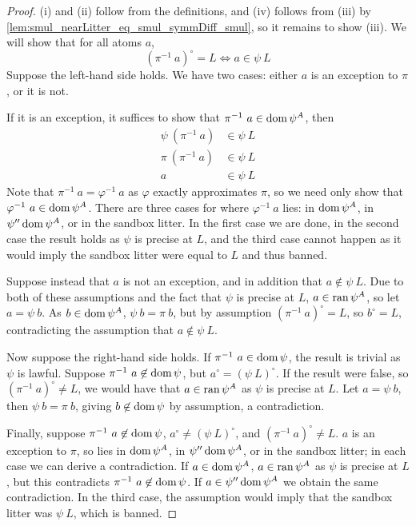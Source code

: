 \begin{proof}
    (i) and (ii) follow from the definitions, and (iv) follows from (iii) by \cref{lem:smul_nearLitter_eq_smul_symmDiff_smul}, so it remains to show (iii).
    We will show that for all atoms \( a \),
    \[ (\pi^{-1}\ a)^\circ = L \Leftrightarrow a \in \psi\ L \]
    Suppose the left-hand side holds.
    We have two cases: either \( a \) is an exception to \( \pi \), or it is not.

    If it is an exception, it suffices to show that \( \pi^{-1}\ a \in \operatorname{dom} \psi^A \), then
    \begin{align*}
        \psi\ (\pi^{-1}\ a) &\in \psi\ L \\
        \pi\ (\pi^{-1}\ a) &\in \psi\ L \\
        a &\in \psi\ L
    \end{align*}
    Note that \( \pi^{-1}\ a = \varphi^{-1}\ a \) as \( \varphi \) exactly approximates \( \pi \), so we need only show that \( \varphi^{-1}\ a \in \operatorname{dom} \psi^A \).
    There are three cases for where \( \varphi^{-1}\ a \) lies: in \( \operatorname{dom} \psi^A \), in \( \psi '' \operatorname{dom} \psi^A \), or in the sandbox litter.
    In the first case we are done, in the second case the result holds as \( \psi \) is precise at \( L \), and the third case cannot happen as it would imply the sandbox litter were equal to \( L \) and thus banned.

    Suppose instead that \( a \) is not an exception, and in addition that \( a \not\in \psi\ L \).
    Due to both of these assumptions and the fact that \( \psi \) is precise at \( L \), \( a \in \operatorname{ran} \psi^A \), so let \( a = \psi\ b \).
    As \( b \in \operatorname{dom} \psi^A \), \( \psi\ b = \pi\ b \), but by assumption \( (\pi^{-1}\ a)^\circ = L \), so \( b^\circ = L \), contradicting the assumption that \( a \not\in \psi\ L \).

    Now suppose the right-hand side holds.
    If \( \pi^{-1}\ a \in \operatorname{dom} \psi \), the result is trivial as \( \psi \) is lawful.
    Suppose \( \pi^{-1}\ a \not\in \operatorname{dom} \psi \), but \( a^\circ = (\psi\ L)^\circ \).
    If the result were false, so \( (\pi^{-1}\ a)^\circ \neq L \), we would have that \( a \in \operatorname{ran} \psi^A \) as \( \psi \) is precise at \( L \).
    Let \( a = \psi\ b \), then \( \psi\ b = \pi\ b \), giving \( b \not\in \operatorname{dom} \psi \) by assumption, a contradiction.

    Finally, suppose \( \pi^{-1}\ a \not\in \operatorname{dom} \psi \), \( a^\circ \neq (\psi\ L)^\circ \), and \( (\pi^{-1}\ a)^\circ \neq L \).
    \( a \) is an exception to \( \pi \), so lies in \( \operatorname{dom} \psi^A \), in \( \psi '' \operatorname{dom} \psi^A \), or in the sandbox litter; in each case we can derive a contradiction.
    If \( a \in \operatorname{dom} \psi^A \), \( a \in \operatorname{ran} \psi^A \) as \( \psi \) is precise at \( L \), but this contradicts \( \pi^{-1}\ a \not\in \operatorname{dom} \psi \).
    If \( a \in \psi '' \operatorname{dom} \psi^A \) we obtain the same contradiction.
    In the third case, the assumption would imply that the sandbox litter was \( \psi\ L \), which is banned.
\end{proof}
